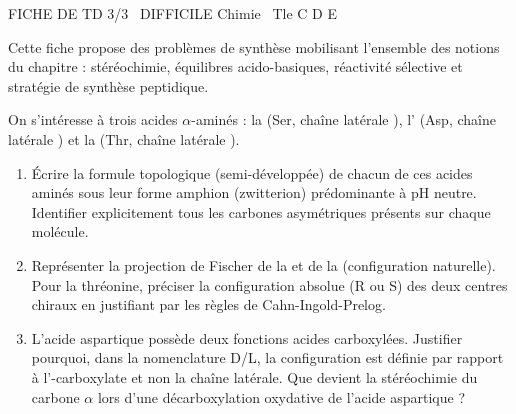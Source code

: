 \documentclass[11pt]{article}
\begin{document}
\begin{tcolorbox}[enhanced,colback=popink,colframe=popink,arc=10pt,boxrule=0pt,left=12pt,right=12pt,top=9pt,bottom=9pt]
{\color{white}\popxbold\small FICHE DE TD 3/3 \textbullet\ DIFFICILE \hfill Chimie \textbullet\ Tle C D E\par}
\end{tcolorbox}
\vspace{4pt}
Cette fiche propose des problèmes de synthèse mobilisant l'ensemble des notions du chapitre : stéréochimie, équilibres acido-basiques, réactivité sélective et stratégie de synthèse peptidique.

\begin{exercice}
On s'intéresse à trois acides $\alpha$-aminés : la  (Ser, chaîne latérale ), l' (Asp, chaîne latérale ) et la  (Thr, chaîne latérale ).
\begin{enumerate}
    \item Écrire la formule topologique (semi-développée) de chacun de ces acides aminés sous leur forme amphion (zwitterion) prédominante à pH neutre. Identifier explicitement tous les carbones asymétriques présents sur chaque molécule.
    \item Représenter la projection de Fischer de la  et de la  (configuration naturelle). Pour la thréonine, préciser la configuration absolue (R ou S) des deux centres chiraux en justifiant par les règles de Cahn-Ingold-Prelog.
    \item L'acide aspartique possède deux fonctions acides carboxylées. Justifier pourquoi, dans la nomenclature D/L, la configuration est définie par rapport à l'\ce{\alpha}-carboxylate et non la chaîne latérale. Que devient la stéréochimie du carbone $\alpha$ lors d'une décarboxylation oxydative de l'acide aspartique ?
\end{enumerate}
\end{exercice}
\end{document}
